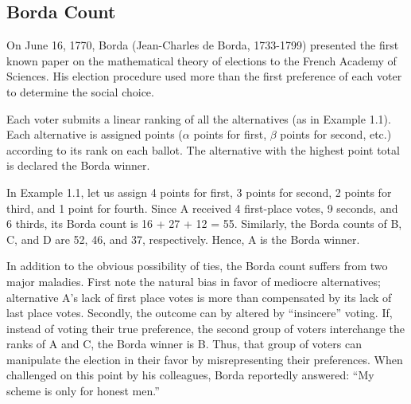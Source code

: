 \documentclass{article}
\begin{document}
\subsection*{Borda Count}

On June 16, 1770, Borda (Jean-Charles de Borda, 1733-1799) presented the first known paper on the mathematical theory of elections to the French Academy of Sciences. His election procedure used more than the first preference of each voter to determine the social choice.

Each voter submits a linear ranking of all the alternatives (as in Example 1.1). Each alternative is assigned points ($\alpha$ points for first, $\beta$ points for second, etc.) according to its rank on each ballot. The alternative with the highest point total is declared the Borda winner.

In Example 1.1, let us assign 4 points for first, 3 points for second, 2 points for third, and 1 point for fourth. Since A received 4 first-place votes, 9 seconds, and 6 thirds, its Borda count is 16 + 27 + 12 = 55. Similarly, the Borda counts of B, C, and D are 52, 46, and 37, respectively. Hence, A is the Borda winner.

In addition to the obvious possibility of ties, the Borda count suffers from two major maladies. First note the natural bias in favor of mediocre alternatives; alternative A's lack of first place votes is more than compensated by its lack of last place votes. Secondly, the outcome can by altered by ``insincere'' voting. If, instead of voting their true preference, the second group of voters interchange the ranks of A and C, the Borda winner is B. Thus, that group of voters can manipulate the election in their favor by misrepresenting their preferences. When challenged on this point by his colleagues, Borda reportedly answered: ``My scheme is only for honest men.''
\end{document}
